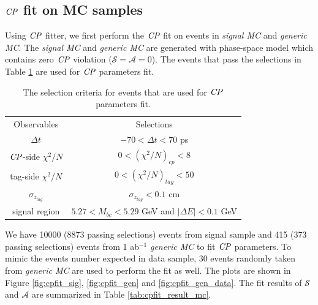 \subsection{$\it{CP}$ fit on MC samples}
Using $\it{CP}$ fitter, we first perform the $\it{CP}$ fit on events in \textit{signal MC} and \textit{generic MC}.
The \textit{signal MC} and \textit{generic MC} are generated with phase-space model which contains zero $\it{CP}$ violation ($\mathcal{S}=\mathcal{A}=0$). The events that pass the selections in Table \ref{tab:cutCP} are used for $\it{CP}$ parameters fit.
\begin{table}
	\centering
\begin{tabular}{c|c}
	\hline
	Observables & Selections \\
	$\Delta t$ & $-70 < \Delta t < 70$ ps\\
	$\it{CP}$-side $\chi^2/N$ & $0 < (\chi^2/N)_{cp} < 8 $ \\
	tag-side $\chi^2/N$  & $0 < (\chi^2/N)_{tag} < 50 $\\
	$\sigma_{z_{tag}}$ &  $\sigma_{z_{tag}} < 0.1$ cm\\
	signal region & $5.27 < M_{bc} < 5.29$ GeV and $|\Delta E| < 0.1$ GeV\\
	\hline

\end{tabular}
\caption{The selection criteria for events that are used for $\it{CP}$ parameters fit.}
\label{tab:cutCP}
\end{table}
We have 10000 (8873 passing selections) events from signal sample and 415 (373 passing selections) events from 1 ab$^{-1}$ \textit{generic MC} to fit $\it{CP}$ parameters. To mimic the events number expected in data sample, 30 events randomly taken from \textit{generic MC} are used to perform the fit as well. The plots are shown in Figure \ref{fig:cpfit_sig}, \ref{fig:cpfit_gen} and \ref{fig:cpfit_gen_data}. The fit results of $\mathcal{S}$ and $\mathcal{A}$ are summarized in Table \ref{tab:cpfit_result_mc}.
